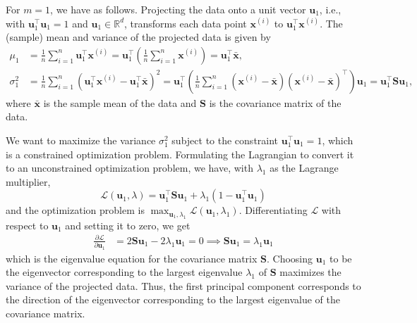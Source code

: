 For \( m = 1 \), we have as follows.
Projecting the data onto a unit vector \( \mathbf{u}_1 \), i.e., with \( \mathbf{u}_1^\top \mathbf{u}_1 = 1 \) and \( \mathbf{u}_1 \in \mathbb{R}^d \), transforms each data point \( \mathbf{x}^{(i)} \) to \( \mathbf{u}_1^\top \mathbf{x}^{(i)} \).
The (sample) mean and variance of the projected data is given by
\begin{align*}
    \mu_1
     & =
    \frac{1}{n} \sum_{i=1}^{n} \mathbf{u}_1^\top \mathbf{x}^{(i)}
    =
    \mathbf{u}_1^\top \left( \frac{1}{n} \sum_{i=1}^{n} \mathbf{x}^{(i)} \right)
    =
    \mathbf{u}_1^\top \bar{\mathbf{x}},
    \\
    \sigma_1^2
     & =
    \frac{1}{n} \sum_{i=1}^{n} {( \mathbf{u}_1^\top \mathbf{x}^{(i)} - \mathbf{u}_1^\top \bar{\mathbf{x}} )}^2
    =
    \mathbf{u}_1^\top \left( \frac{1}{n} \sum_{i=1}^{n} {(\mathbf{x}^{(i)} - \bar{\mathbf{x}})}{(\mathbf{x}^{(i)} - \bar{\mathbf{x}})^\top} \right) \mathbf{u}_1
    =
    \mathbf{u}_1^\top \mathbf{S} \mathbf{u}_1,
\end{align*}
where \( \bar{\mathbf{x}} \) is the sample mean of the data and \( \mathbf{S} \) is the covariance matrix of the data.

We want to maximize the variance \( \sigma_1^2 \) subject to the constraint \( \mathbf{u}_1^\top \mathbf{u}_1 = 1 \), which is a constrained optimization problem.
Formulating the Lagrangian to convert it to an unconstrained optimization problem, we have, with \( \lambda_1 \) as the Lagrange multiplier,
\begin{equation*}
    \mathcal{L}(\mathbf{u}_1, \lambda)
    =
    \mathbf{u}_1^\top \mathbf{S} \mathbf{u}_1 + \lambda_1 (1 - \mathbf{u}_1^\top \mathbf{u}_1)
\end{equation*}
and the optimization problem is \( \max_{\mathbf{u}_1, \lambda_1} \mathcal{L}(\mathbf{u}_1, \lambda_1) \).
Differentiating \( \mathcal{L} \) with respect to \( \mathbf{u}_1 \) and setting it to zero, we get
\begin{align*}
    \frac{\partial \mathcal{L}}{\partial \mathbf{u}_1}
     & =
    2 \mathbf{S} \mathbf{u}_1 - 2 \lambda_1 \mathbf{u}_1
    =
    0
    \implies
    \mathbf{S} \mathbf{u}_1 = \lambda_1 \mathbf{u}_1
\end{align*}
which is the eigenvalue equation for the covariance matrix \( \mathbf{S} \).
Choosing \( \mathbf{u}_1 \) to be the eigenvector corresponding to the largest eigenvalue \( \lambda_1 \) of \( \mathbf{S} \) maximizes the variance of the projected data.
Thus, the first principal component corresponds to the direction of the eigenvector corresponding to the largest eigenvalue of the covariance matrix.

